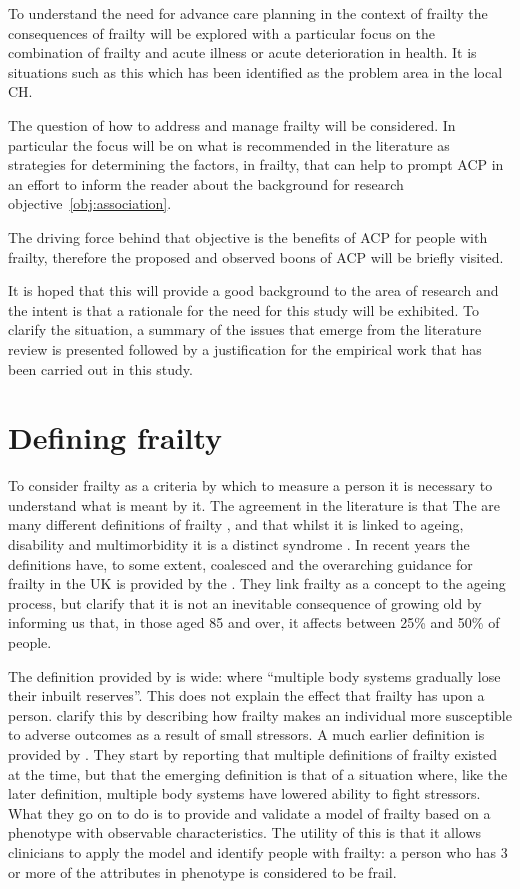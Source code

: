 \documentclass
[
	12pt,
	a4paper,
	oneside,
]{report}
\begin{document}
To understand the need for advance care planning in the context of frailty
the consequences of frailty will be explored with a particular focus on the
combination of frailty and acute illness or acute deterioration in health. 
It is situations such as this which has been identified as the problem area
in the local CH.

The question of how to address and manage frailty will be considered. In 
particular the focus will be on what is recommended in the literature as 
strategies for determining the factors, in frailty, that can help to prompt
ACP in an effort to inform the reader about the background for research 
objective~\ref{obj:association}.

The driving force behind that objective is the benefits of ACP for people with 
frailty, therefore the proposed and observed boons of ACP will be briefly 
visited.

It is hoped that this will provide a good background to the area of research
and the intent is that a rationale for the need for this study will be 
exhibited. To clarify the situation, a summary of the issues that emerge from
the literature review is presented followed by a justification for the
empirical work that has been carried out in this study.

\section{Defining frailty}

To consider frailty as a criteria by which to measure a person it is necessary
to understand what is meant by it. The agreement in the literature is that The
are many different definitions of frailty
\parencite{ensrud:08,rockwood:05,conroy:09}, and that whilst it is linked to
ageing, disability and multimorbidity it is a distinct syndrome
\parencite{fried:01,conroy:09}. In recent years the definitions have, to some
extent, coalesced and the overarching guidance for frailty in the 
UK is provided by the \textcite{bgs:14}. They link frailty as a concept to the 
ageing process, but clarify that it is not an inevitable consequence of growing
old by informing us that, in those aged 85 and over, it affects between 25\% 
and 50\% of people. 

The definition provided by \textcite{bgs:14} is wide: where ``multiple body 
systems gradually lose
their inbuilt reserves''. This does not explain the effect that frailty has upon
a person. \textcite{clegg:13} clarify this by describing how frailty makes an
individual more susceptible to adverse outcomes as a result of small stressors.
A much earlier definition is provided by \textcite{fried:01}. They
start by reporting that multiple definitions of frailty existed at the time, 
but that the emerging definition is that of a situation where, like the later
definition, multiple body systems have lowered ability to fight stressors. What
they go on to do is to provide and validate a model of frailty based on a phenotype
with observable characteristics. The utility of this is that it allows 
clinicians to apply the model and identify people with frailty: a person who has
3 or more of the attributes in phenotype is considered to be frail. 
\end{document}
